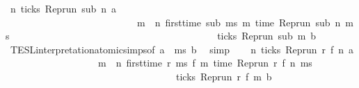 \begin{isabellebody}
\ {\isacartoucheopen}{\isasymforall}n{\isachardot}\ ticks\ {\isacharparenleft}{\isacharparenleft}Rep{\isacharunderscore}run\ sub{\isacharparenright}\ n\ a{\isacharparenright}\isanewline
\ \ \ \ \ \ \ \ \ \ \ \ \ \ \ \ \ \ \ \ \ \ \ \ \ \ {\isasymlongrightarrow}\ {\isacharparenleft}{\isasymforall}m\ {\isasymge}\ n{\isachardot}\ first{\isacharunderscore}time\ sub\ ms\ m\ {\isacharparenleft}time\ {\isacharparenleft}{\isacharparenleft}Rep{\isacharunderscore}run\ sub{\isacharparenright}\ n\ ms{\isacharparenright}\ {\isacharplus}\ {\isasymdelta}{\isasymtau}{\isacharparenright}\isanewline
\ \ \ \ \ \ \ \ \ \ \ \ \ \ \ \ \ \ \ \ \ \ \ \ \ \ \ \ \ \ \ \ \ \ \ \ \ \ \ {\isasymlongrightarrow}\ ticks\ {\isacharparenleft}{\isacharparenleft}Rep{\isacharunderscore}run\ sub{\isacharparenright}\ m\ b{\isacharparenright}{\isacharparenright}{\isacartoucheclose}\isanewline
\ \ \ \ \isamarkupfalse%
\ TESL{\isacharunderscore}interpretation{\isacharunderscore}atomic{\isachardot}simps{\isacharparenleft}{}{\isacharparenright}{\isacharbrackleft}of\ {\isacartoucheopen}a{\isacartoucheclose}\ {\isacartoucheopen}{\isasymdelta}{\isasymtau}{\isacartoucheclose}\ {\isacartoucheopen}ms{\isacartoucheclose}\ {\isacartoucheopen}b{\isacartoucheclose}{\isacharbrackright}\ \isamarkupfalse%
\ simp\isanewline
\ \ \isamarkupfalse%
\ {\isacharasterisk}{\isacharasterisk}{\isacharcolon}{\isacartoucheopen}{\isasymforall}n\ ticks\ {\isacharparenleft}{\isacharparenleft}Rep{\isacharunderscore}run\ r{\isacharparenright}\ {\isacharparenleft}f\ n\ a{\isacharparenright}\isanewline
\ \ \ \ \ \ \ \ \ \ \ \ \ \ \ \ \ \ {\isasymlongrightarrow}\ {\isacharparenleft}{\isasymforall}m\ {\isasymge}\ n\ first{\isacharunderscore}time\ r\ ms\ {\isacharparenleft}f\ m\ {\isacharparenleft}time\ {\isacharparenleft}{\isacharparenleft}Rep{\isacharunderscore}run\ r{\isacharparenright}\ {\isacharparenleft}f\ n\ ms{\isacharparenright}\ {\isacharplus}\ {\isasymdelta}{\isasymtau}{\isacharparenright}\isanewline
\ \ \ \ \ \ \ \ \ \ \ \ \ \ \ \ \ \ \ \ \ \ \ \ \ \ \ \ \ \ \ \ \ \ {\isasymlongrightarrow}\ ticks\ {\isacharparenleft}{\isacharparenleft}Rep{\isacharunderscore}run\ r{\isacharparenright}\ {\isacharparenleft}f\ m\ b{\isacharparenright}{\isacharparenright}\ \ {\isacartoucheclose}\isanewline

\end{isabellebody}
